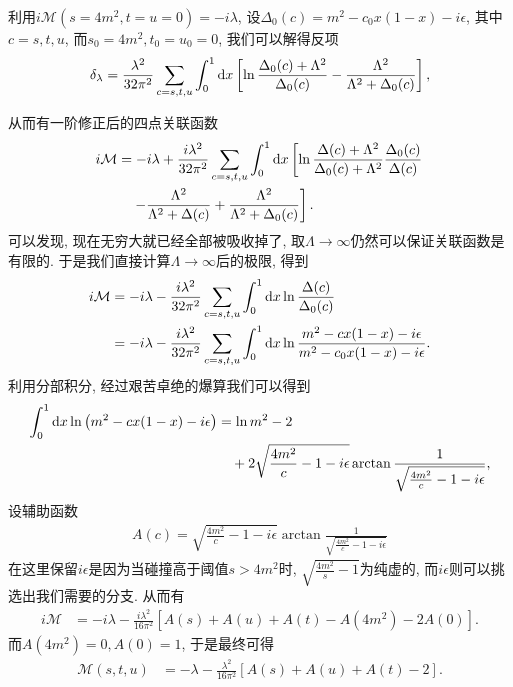 利用$i\mathcal M(s=4m^2, t=u=0)=-i\lambda$, 设$\Delta_0(c)=m^2-c_0x(1-x)-i\epsilon$, 其中$c=s, t, u$, 而$s_0=4m^2, t_0=u_0=0$, 我们可以解得反项
\begin{align}
    \delta_\lambda=\frac{\lambda^2}{32\pi^2}\sum_{c=s,t,u}\int_0^1\mathrm dx\left[\ln\frac{\Delta_0(c)+\Lambda^2}{\Delta_0(c)}-\frac{\Lambda^2}{\Lambda^2+\Delta_0(c)}\right],
\end{align}

从而有一阶修正后的四点关联函数
\begin{align}
    i\mathcal M&=-i\lambda+\frac{i\lambda^2}{32\pi^2}\sum_{c=s,t,u}\int_0^1\mathrm dx\left[\ln\frac{\Delta(c)+\Lambda^2}{\Delta_0(c)+\Lambda^2}\frac{\Delta_0(c)}{\Delta(c)}\right.\notag\\
    &\quad\left.-\frac{\Lambda^2}{\Lambda^2+\Delta(c)}+\frac{\Lambda^2}{\Lambda^2+\Delta_0(c)}\right].
\end{align}
可以发现, 现在无穷大就已经全部被吸收掉了, 取$\Lambda\to\infty$仍然可以保证关联函数是有限的. 于是我们直接计算$\Lambda\to\infty$后的极限, 得到
\begin{align}
    i\mathcal M&=-i\lambda-\frac{i\lambda^2}{32\pi^2}\sum_{c=s,t,u}\int_0^1\mathrm dx\ln\frac{\Delta(c)}{\Delta_0(c)}\notag\\
    &=-i\lambda-\frac{i\lambda^2}{32\pi^2}\sum_{c=s,t,u}\int_0^1\mathrm dx\ln\frac{m^2-cx(1-x)-i\epsilon}{m^2-c_0x(1-x)-i\epsilon}.
\end{align}
利用分部积分, 经过艰苦卓绝的爆算我们可以得到
\begin{align}
    \int_0^1\mathrm dx\ln\left(m^2-cx(1-x)-i\epsilon\right)&=\ln m^2-2\notag\\
    &\quad+2\sqrt{\frac{4m^2}{c}-1-i\epsilon}\arctan\frac1{\sqrt{\frac{4m^2}{c}-1-i\epsilon}},
\end{align}
设辅助函数
\begin{align}
    A(c)=\sqrt{\frac{4m^2}{c}-1-i\epsilon}\arctan\frac1{\sqrt{\frac{4m^2}{c}-1-i\epsilon}}
\end{align}
在这里保留$i\epsilon$是因为当碰撞高于阈值$s>4m^2$时, $\sqrt{\frac{4m^2}{s}-1}$为纯虚的, 而$i\epsilon$则可以挑选出我们需要的分支. 从而有
\begin{align}
    i\mathcal M&=-i\lambda-\frac{i\lambda^2}{16\pi^2}\left[A(s)+A(u)+A(t)-A(4m^2)-2A(0)\right].
\end{align}
而$A(4m^2)=0, A(0)=1$, 于是最终可得
\begin{align}
    \mathcal M(s, t, u)&=-\lambda-\frac{\lambda^2}{16\pi^2}\left[A(s)+A(u)+A(t)-2\right].
\end{align}

